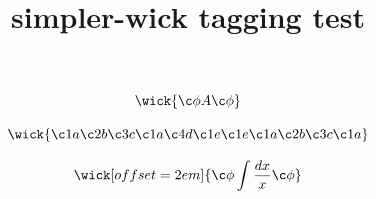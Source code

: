 \documentclass{article}
\title{simpler-wick tagging test}
\begin{document}
\begin{equation}
\wick{\c\phi A \c\phi}
\end{equation}

\begin{equation}
\wick{
\c1 a \c2 b \c3 c \c1 a \c4 d \c1 e
\c1 e \c1 a \c2 b \c3 c \c1 a
}
\end{equation}

\begin{equation}
\wick[offset=2em]{\c\phi \int \frac{dx}{x} \c\phi}
\end{equation} 
\end{document}

